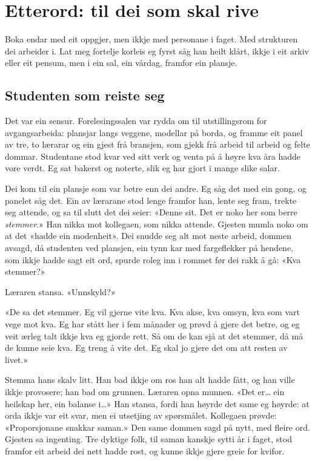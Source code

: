 \chapter*{Etterord: til dei som skal rive}

Boka endar med eit oppgjer, men ikkje med personane i faget. Med strukturen dei arbeider i. Lat meg fortelje korleis eg fyrst såg han heilt klårt, ikkje i eit arkiv eller eit pensum, men i ein sal, ein vårdag, framfor ein plansje.

\section{Studenten som reiste seg}

Det var ein sensur. Forelesingssalen var rydda om til utstillingsrom for avgangsarbeida: plansjar langs veggene, modellar på borda, og framme eit panel av tre, to lærarar og ein gjest frå bransjen, som gjekk frå arbeid til arbeid og felte dommar. Studentane stod kvar ved sitt verk og venta på å høyre kva åra hadde vore verdt. Eg sat bakerst og noterte, slik eg har gjort i mange slike salar.

Dei kom til ein plansje som var betre enn dei andre. Eg såg det med ein gong, og panelet såg det. Ein av lærarane stod lenge framfor han, lente seg fram, trekte seg attende, og sa til slutt det dei seier: «Denne sit. Det er noko her som berre \emph{stemmer}.» Han nikka mot kollegaen, som nikka attende. Gjesten mumla noko om at det «hadde ein modenheit». Dei snudde seg alt mot neste arbeid, dommen avsagd, då studenten ved plansjen, ein tynn kar med fargeflekker på hendene, som ikkje hadde sagt eit ord, spurde roleg inn i rommet før dei rakk å gå: «Kva stemmer?»

Læraren stansa. «Unnskyld?»

«De sa det stemmer. Eg vil gjerne vite kva. Kva akse, kva omsyn, kva som vart vege mot kva. Eg har stått her i fem månader og prøvd å gjere det betre, og eg veit ærleg talt ikkje kva eg gjorde rett. Så om de kan sjå at det stemmer, då må de kunne seie kva. Eg treng å vite det. Eg skal jo gjere det om att resten av livet.»

Stemma hans skalv litt. Han bad ikkje om ros han alt hadde fått, og han ville ikkje provosere; han bad om grunnen. Læraren opna munnen. «Det er… ein heilskap her, ein balanse i…» Han stansa, fordi han høyrde det same eg høyrde: at orda ikkje var eit svar, men ei utsetjing av spørsmålet. Kollegaen prøvde: «Proporsjonane snakkar saman.» Den same dommen sagd på nytt, med fleire ord. Gjesten sa ingenting. Tre dyktige folk, til saman kanskje sytti år i faget, stod framfor eit arbeid dei nett hadde rost, og kunne ikkje gjere greie for kvifor.

